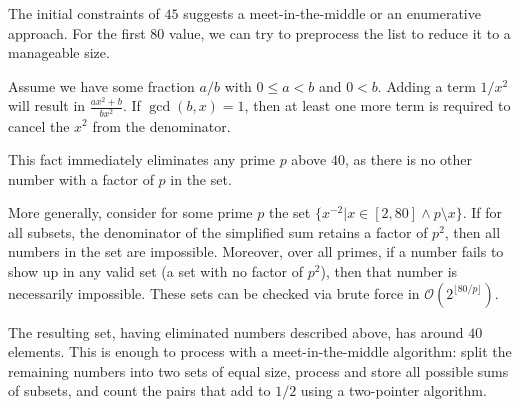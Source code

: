 \documentclass{article}
\begin{document}
The initial constraints of $45$ suggests a meet-in-the-middle or an enumerative approach. For the first $80$ value, we can try to preprocess the list to reduce it to a manageable size.

Assume we have some fraction $a/b$ with $0\leq a<b$ and $0<b$. Adding a term $1/x^2$ will result in $\frac{ax^2+b}{bx^2}$. If $\gcd(b,x)=1$, then at least one more term is required to cancel the $x^2$ from the denominator. 

This fact immediately eliminates any prime $p$ above $40$, as there is no other number with a factor of $p$ in the set. 

More generally, consider for some prime $p$ the set $\{x^{-2}|x\in[2,80]\land p\setminus x\}$. If for all subsets, the denominator of the simplified sum retains a factor of $p^2$, then all numbers in the set are impossible. Moreover, over all primes, if a number fails to show up in any valid set (a set with no factor of $p^2$), then that number is necessarily impossible. These sets can be checked via brute force in $\mathcal{O}(2^{\lfloor 80/p\rfloor})$. 

The resulting set, having eliminated numbers described above, has around $40$ elements. This is enough to process with a meet-in-the-middle algorithm: split the remaining numbers into two sets of equal size, process and store all possible sums of subsets, and count the pairs that add to $1/2$ using a two-pointer algorithm.
\end{document}
